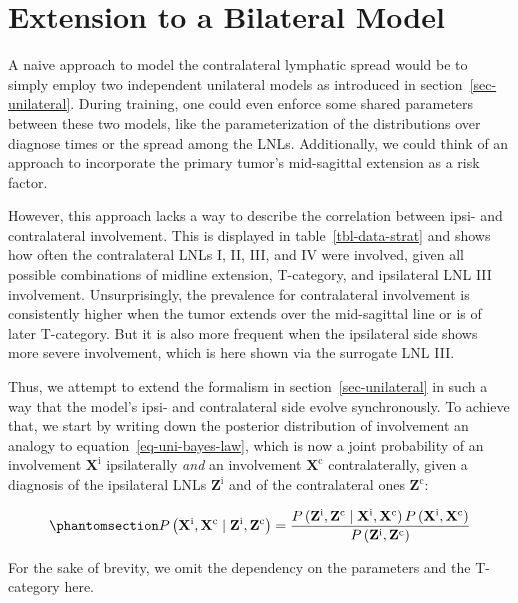 \documentclass[
  sn-mathphys-num,
]{sn-jnl}
\begin{document}
\section{Extension to a Bilateral Model}\label{sec-ext-to-contra}

A naive approach to model the contralateral lymphatic spread would be to
simply employ two independent unilateral models as introduced in
section~\ref{sec-unilateral}. During training, one could even enforce
some shared parameters between these two models, like the
parameterization of the distributions over diagnose times or the spread
among the LNLs. Additionally, we could think of an approach to
incorporate the primary tumor's mid-sagittal extension as a risk factor.

However, this approach lacks a way to describe the correlation between
ipsi- and contralateral involvement. This is displayed in
table~\ref{tbl-data-strat} and shows how often the contralateral LNLs I,
II, III, and IV were involved, given all possible combinations of
midline extension, T-category, and ipsilateral LNL III involvement.
Unsurprisingly, the prevalence for contralateral involvement is
consistently higher when the tumor extends over the mid-sagittal line or
is of later T-category. But it is also more frequent when the
ipsilateral side shows more severe involvement, which is here shown via
the surrogate LNL III.

Thus, we attempt to extend the formalism in section~\ref{sec-unilateral}
in such a way that the model's ipsi- and contralateral side evolve
synchronously. To achieve that, we start by writing down the posterior
distribution of involvement an analogy to
equation~\ref{eq-uni-bayes-law}, which is now a joint probability of an
involvement \(\mathbf{X}^\text{i}\) ipsilaterally \emph{and} an
involvement \(\mathbf{X}^\text{c}\) contralaterally, given a diagnosis
of the ipsilateral LNLs \(\mathbf{Z}^\text{i}\) and of the contralateral
ones \(\mathbf{Z}^\text{c}\):

\begin{equation}\phantomsection\label{eq-bilateral-bayes}{
P \left( \mathbf{X}^\text{i}, \mathbf{X}^\text{c} \mid \mathbf{Z}^\text{i}, \mathbf{Z}^\text{c} \right) = \frac{P \left( \mathbf{Z}^\text{i}, \mathbf{Z}^\text{c} \mid \mathbf{X}^\text{i}, \mathbf{X}^\text{c} \right) P \left( \mathbf{X}^\text{i}, \mathbf{X}^\text{c} \right)}{P \left( \mathbf{Z}^\text{i}, \mathbf{Z}^\text{c} \right)}
}\end{equation}

For the sake of brevity, we omit the dependency on the parameters and
the T-category here.
\end{document}
